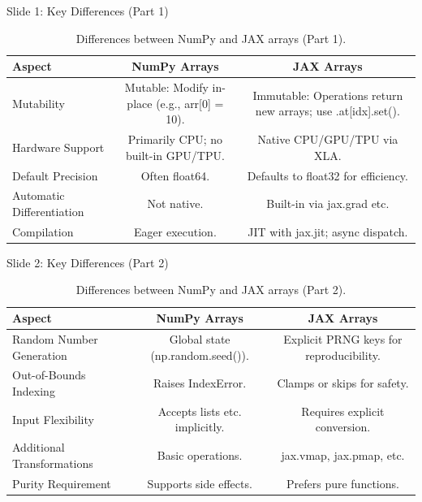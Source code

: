 \documentclass[aspectratio=169]{beamer}
\renewcommand{\footnotesize}{\fontsize{7}{8}\selectfont}
\begin{document}
\begin{frame}[t]{Slide 1: Key Differences (Part 1)}
\footnotesize
\begin{table}
\centering
\begin{tabular}{lcc}
\toprule
Aspect & NumPy Arrays & JAX Arrays \\
\midrule
Mutability & Mutable: Modify in-place (e.g., arr[0] = 10). & Immutable: Operations return new arrays; use .at[idx].set(). \\
Hardware Support & Primarily CPU; no built-in GPU/TPU. & Native CPU/GPU/TPU via XLA. \\
Default Precision & Often float64. & Defaults to float32 for efficiency. \\
Automatic Differentiation & Not native. & Built-in via jax.grad etc. \\
Compilation & Eager execution. & JIT with jax.jit; async dispatch. \\
\bottomrule
\end{tabular}
\caption{Differences between NumPy and JAX arrays (Part 1).}
\end{table}
\end{frame}

\begin{frame}[t]{Slide 2: Key Differences (Part 2)}
\footnotesize
\begin{table}
\centering
\begin{tabular}{lcc}
\toprule
Aspect & NumPy Arrays & JAX Arrays \\
\midrule
Random Number Generation & Global state (np.random.seed()). & Explicit PRNG keys for reproducibility. \\
Out-of-Bounds Indexing & Raises IndexError. & Clamps or skips for safety. \\
Input Flexibility & Accepts lists etc. implicitly. & Requires explicit conversion. \\
Additional Transformations & Basic operations. & jax.vmap, jax.pmap, etc. \\
Purity Requirement & Supports side effects. & Prefers pure functions. \\
\bottomrule
\end{tabular}
\caption{Differences between NumPy and JAX arrays (Part 2).}
\end{table}
\end{frame}
\end{document}
